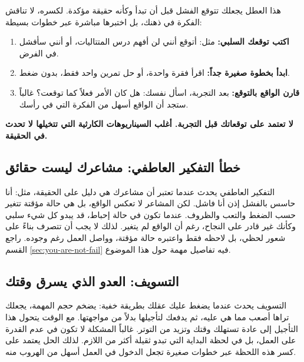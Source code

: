 \documentclass[12pt,a4paper]{book}
\newcommand{\importantAr}[1]{%
	\begin{important}
		\bfseries #1
	\end{important}
}
\begin{document}
هذا العطل يجعلك تتوقع الفشل قبل أن تبدأ وكأنه حقيقة مؤكدة. لكسره، لا تناقش الفكرة في ذهنك، بل اختبرها مباشرة عبر خطوات بسيطة:

\begin{enumerate}
	\item \textbf{اكتب توقعك السلبي:} مثل: أتوقع أنني لن أفهم درس المتتاليات، أو أنني سأفشل في الفرض.
	
	\item \textbf{ابدأ بخطوة صغيرة جداً:} اقرأ فقرة واحدة، أو حل تمرين واحد فقط، بدون ضغط.
	
	\item \textbf{قارن الواقع بالتوقع:} بعد التجربة، اسأل نفسك: هل كان الأمر فعلاً كما توقعت؟ غالباً ستجد أن الواقع أسهل من الفكرة التي في رأسك.
\end{enumerate}

\importantAr{
	لا تعتمد على توقعاتك قبل التجربة. أغلب السيناريوهات الكارثية التي تتخيلها لا تحدث في الحقيقة.
}

	\subsection{خطأ التفكير العاطفي: مشاعرك ليست حقائق}
	\label{subsec:emotional-reasoning}
	
	التفكير العاطفي يحدث عندما تعتبر أن مشاعرك هي دليل على الحقيقة، مثل: أنا حاسس بالفشل إذن أنا فاشل. لكن المشاعر لا تعكس الواقع، بل هي حالة مؤقتة تتغير حسب الضغط والتعب والظروف. عندما تكون في حالة إحباط، قد يبدو كل شيء سلبي وكأنك غير قادر على النجاح، رغم أن الواقع لم يتغير. لذلك لا يجب أن تتصرف بناءً على شعور لحظي، بل لاحظه فقط واعتبره حالة مؤقتة، وواصل العمل رغم وجوده. راجع القسم \ref{sec:you-are-not-fail} فيه تفاصيل مهمة حول هذا الموضوع.
	\subsection{التسويف: العدو الذي يسرق وقتك}
	\label{subsec:procrastination-tools}
	
	التسويف يحدث عندما يضغط عليك عقلك بطريقة خفية: يضخم حجم المهمة، يجعلك تراها أصعب مما هي عليه، ثم يدفعك لتأجيلها بدلاً من مواجهتها. مع الوقت يتحول هذا التأجيل إلى عادة تستهلك وقتك وتزيد من التوتر. غالباً المشكلة لا تكون في عدم القدرة على العمل، بل في لحظة البداية التي تبدو ثقيلة أكثر من اللازم. لذلك الحل يعتمد على كسر هذه اللحظة عبر خطوات صغيرة تجعل الدخول في العمل أسهل من الهروب منه.
\end{document}
